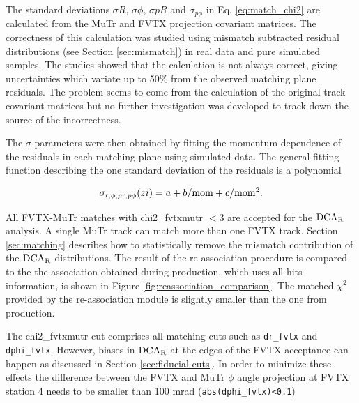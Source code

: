\documentclass[12pt]{article}
\newcommand{\dcar}{$\rm{DCA}_{R}$ }
\begin{document}
The standard deviations $\sigma R$, $\sigma \phi$, $\sigma pR$ and $\sigma_{p\phi}$ in Eq. \ref{eq:match_chi2} are calculated from the MuTr and FVTX projection covariant matrices. The 
correctness of this calculation was studied using mismatch subtracted residual distributions (see Section \ref{sec:mismatch}) in real data and pure simulated samples. The studies showed that 
the calculation is not always correct, giving uncertainties which variate up to 50\% from the observed matching plane residuals. The problem seems to come from the calculation of the original 
track covariant matrices but no further investigation was developed to track down the source of the incorrectness. 

The $\sigma$ parameters were then obtained by fitting the momentum dependence of the residuals in each matching plane using simulated data. The general fitting function describing the 
one standard deviation of the residuals is a polynomial 

\begin{equation}
	\sigma_{r,\phi,pr,p\phi}(zi) = a + b/{\rm mom} + c/{\rm mom}^2.
\end{equation}

All FVTX-MuTr matches with chi2\_fvtxmutr $<$3 are accepted for the \dcar analysis. A single MuTr track can match more than one FVTX track. Section \ref{sec:matching} describes how to 
statistically remove the mismatch contribution of the \dcar distributions. The result of the re-association procedure is compared to the the association obtained during production, which uses 
all hits information, is shown in Figure \ref{fig:reassociation_comparison}. The matched $\chi^2$ provided by the re-association module is slightly smaller than the one from production. 



The chi2\_fvtxmutr cut comprises all matching cuts such as \verb|dr_fvtx| and \verb|dphi_fvtx|. However, biases in \dcar at the edges of the FVTX acceptance can happen as discussed in 
Section \ref{sec:fiducial cuts}. In order to minimize these effects the difference between the FVTX and MuTr $\phi$ angle projection at FVTX station 4 needs to be smaller than 100 mrad 
(\verb|abs(dphi_fvtx)<0.1|)
\end{document}
